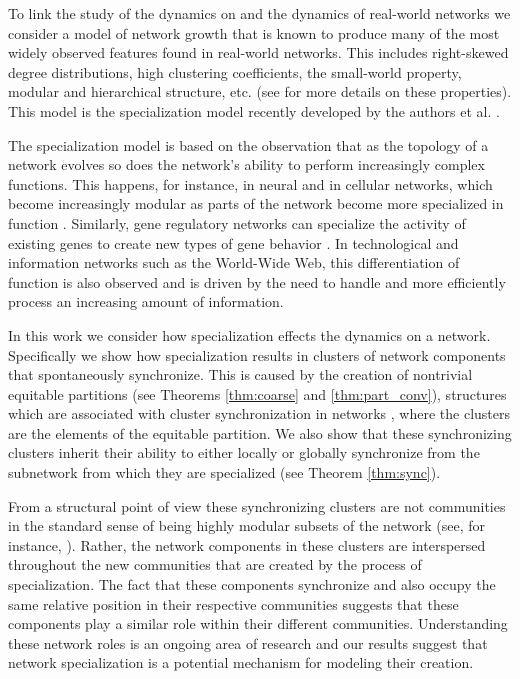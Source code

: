 \documentclass[12pt]{thesis}
\begin{document}
To link the study of the {dynamics on} and the {dynamics of} real-world networks we consider a model of network growth that is known to produce many of the most widely observed features found in real-world networks.
This includes right-skewed degree distributions, high {clustering coefficients}, the {small-world property}, modular and hierarchical structure, etc. (see \cite{Newman10} for more details on these properties).
This model is the {specialization model} recently developed by the authors et al. \cite{8,Bunimovich20}.

The specialization model is based on the observation that as the topology of a network evolves so does the network's ability to perform increasingly complex functions.
This happens, for instance, in neural and in cellular networks, which become increasingly modular as parts of the network become more specialized in function \cite{Sporns13,9}.
Similarly, gene regulatory networks can specialize the activity of existing genes to create new types of gene behavior \cite{Esp10}.
In technological and information networks such as the World-Wide Web, this differentiation of function is also observed and is driven by the need to handle and more efficiently process an increasing amount of information.

In this work we consider how specialization effects the {dynamics on} a network.
Specifically we show how specialization results in clusters of network components that spontaneously synchronize.
This is caused by the creation of nontrivial equitable partitions (see Theorems \ref{thm:coarse} and \ref{thm:part_conv}), structures which are associated with cluster synchronization in networks \cite{10,11,12}, where the {clusters} are the elements of the equitable partition.
We also show that these synchronizing clusters inherit their ability to either locally or globally synchronize from the subnetwork from which they are specialized (see Theorem \ref{thm:sync}).

From a structural point of view these synchronizing clusters are not communities in the standard sense of being highly modular subsets of the network (see, for instance, \cite{Newman10}).
Rather, the network components in these clusters are interspersed throughout the new communities that are created by the process of specialization.
The fact that these components synchronize and also occupy the same relative position in their respective communities suggests that these components  play a similar {role} within their different communities.
Understanding these network roles is an ongoing area of research {\cite{13,14,15}} and our results suggest that network specialization is a potential mechanism for modeling their creation.
\end{document}

